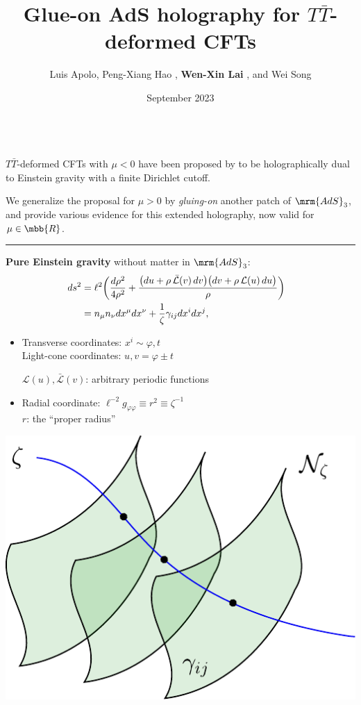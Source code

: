 \documentclass[10pt]{article}
\title{Glue-on AdS holography for $T\bar T$-deformed CFTs}
\author{%
	Luis Apolo,
	Peng-Xiang Hao \textkai{郝鹏翔},
	\textbf{Wen-Xin Lai \textkai{赖文昕}},
	and Wei Song \textkai{宋伟}
}
\date{September 2023}
\newcommand{\TTbar}{\texorpdfstring{\ensuremath{T\bar{T}}}{TTbar}\xspace}
\begin{document}
\maketitle
\thispagestyle{empty}


\begin{multicols}{3}

\,\\[-2.2\baselineskip]

\TTbar-deformed CFTs with $\mu < 0$ have been proposed by \mbox{\textcite{McGough:2016lol}} to be holographically dual to Einstein gravity with a finite \mbox{Dirichlet} cutoff.

We generalize the proposal for $\mu > 0$ by \textit{gluing-on} another patch of $\mrm{AdS}_3$, and \mbox{provide} various evidence for this extended holography, now valid for $\mu \in \mbb{R}$.

\vspace{.8\baselineskip}
\hrule
\vspace{.3\baselineskip}

\textbf{Pure Einstein gravity} without matter in $\mrm{AdS}_3$:
\begin{align}
\hspace{-.8em}
	ds^2
	&= \ell^2 \bigg( \frac{d\rho^2}{4 \rho^2} + \frac{ \big( du + \rho \, \mathcal {\bar L}(v)\, dv \big) \big( dv + \rho \, \mathcal L(u)\, du \big) }{\rho} \bigg) \notag\\
	&= n_\mu n_\nu dx^\mu dx^\nu + \frac{1}{\zeta} \gamma_{ij}dx^i dx^j, \label{fggauge}
\end{align}

\begin{itemize}
\item Transverse coordinates: $x^{i} \sim \varphi, t$ \\
	Light-cone coordinates: $u,v = \varphi \pm t$

	$\mathcal L(u), \bar{\mathcal L}(v)$: arbitrary periodic functions
\item Radial coordinate: $
	\ell^{-2} g_{\varphi\varphi} \equiv r^2 \equiv \zeta^{-1}$\\
	$r$: the ``proper radius''
\end{itemize}
\begin{center}
	\vspace{-.5\baselineskip}
	\includegraphics[width=.52\linewidth]{img/foliation.pdf}
	

\end{center}
\end{multicols}
\end{document}
